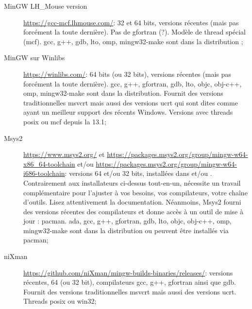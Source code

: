 \begin{description}
\item[MinGW LH\_Mouse version] \url{https://gcc-mcf.lhmouse.com/}: 32 et 64 bits, versions récentes (mais pas forcément la toute dernière). Pas de gfortran (?). Modèle de thread spécial (mcf).  gcc, g++, gdb, lto, omp, mingw32-make sont dans la distribution ;
\item[MinGW sur Winlibs] \url{https://winlibs.com/}: 64 bits (ou 32 bits), versions récentes (mais pas forcément la toute dernière). gcc, g++, gfortran, gdb, lto, objc, obj-c++, omp, mingw32-make sont dans la distribution. Fournit des versions traditionnelles msvcrt mais aussi des versions ucrt qui sont dites comme ayant un meilleur support des récents Windows. Versions avec threads posix ou mcf depuis la 13.1;
\item[Msys2] \url{https://www.msys2.org/} et \url{https://packages.msys2.org/group/mingw-w64-x86_64-toolchain} et/ou \url{https://packages.msys2.org/group/mingw-w64-i686-toolchain}: versions 64 et/ou 32 bits, installées dans  et/ou . Contrairement aux installateurs ci-dessus tout-en-un, nécessite un travail complémentaire pour l'ajuster à vos besoins, vos compilateurs, votre chaîne d'outils. Lisez attentivement la documentation. Néanmoins, Msys2 fourni des versions récentes des compilateurs et donne accès à un outil de mise à jour : pacman. ada, gcc, g++, gfortran, gdb, lto, objc, obj-c++, omp, mingw32-make sont dans la distribution ou peuvent être installés via pacman;
\item[niXman] \url{https://github.com/niXman/mingw-builds-binaries/releases/}: versions récentes, 64 (ou 32 bit), compilateurs gcc, g++, gfortran ainsi que gdb. Fournit des versions traditionnelles msvcrt mais aussi des versions ucrt. Threads posix ou win32;
\end{description}



